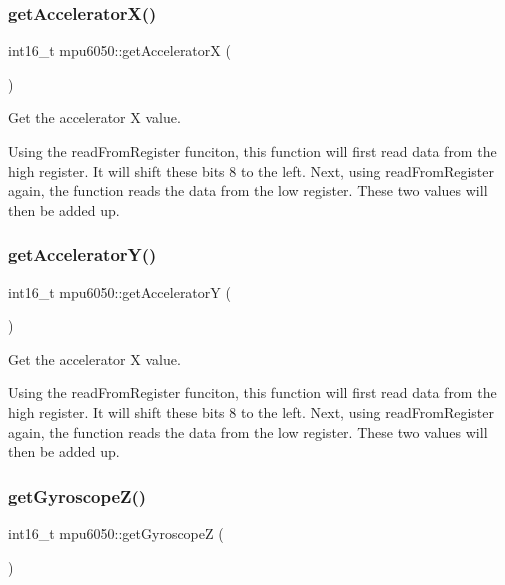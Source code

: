 \subsubsection{\texorpdfstring{get\+Accelerator\+X()}{getAcceleratorX()}}
{\footnotesize\ttfamily int16\+\_\+t mpu6050\+::get\+AcceleratorX (\begin{DoxyParamCaption}{ }\end{DoxyParamCaption})}



Get the accelerator X value. 

Using the read\+From\+Register funciton, this function will first read data from the high register. It will shift these bits 8 to the left. Next, using read\+From\+Register again, the function reads the data from the low register. These two values will then be added up. \mbox{\label{classmpu6050_ae4dce81dd2af2fc9288b2f3966f59333}} 
\subsubsection{\texorpdfstring{get\+Accelerator\+Y()}{getAcceleratorY()}}
{\footnotesize\ttfamily int16\+\_\+t mpu6050\+::get\+AcceleratorY (\begin{DoxyParamCaption}{ }\end{DoxyParamCaption})}



Get the accelerator X value. 

Using the read\+From\+Register funciton, this function will first read data from the high register. It will shift these bits 8 to the left. Next, using read\+From\+Register again, the function reads the data from the low register. These two values will then be added up. \mbox{\label{classmpu6050_af1dcb00f30964e8ea1f20b1f4105b46a}} 
\subsubsection{\texorpdfstring{get\+Gyroscope\+Z()}{getGyroscopeZ()}}
{\footnotesize\ttfamily int16\+\_\+t mpu6050\+::get\+GyroscopeZ (\begin{DoxyParamCaption}{ }\end{DoxyParamCaption})}



